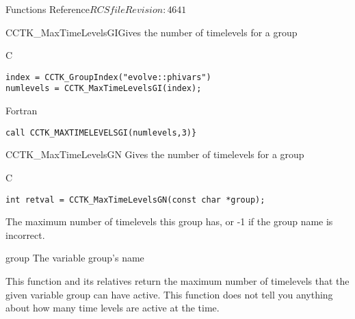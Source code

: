 \begin{cactuspart}{ Functions Reference}{$RCSfile$}{$Revision: 4641 $}
\begin{FunctionDescription}{CCTK\_MaxTimeLevelsGI}{Gives the number of timelevels for a group}
\begin{ExampleSection}
\begin{Example}{C}
\begin{verbatim}
index = CCTK_GroupIndex("evolve::phivars")
numlevels = CCTK_MaxTimeLevelsGI(index);
\end{verbatim}
\end{Example}
\begin{Example}{Fortran}
\begin{verbatim}
call CCTK_MAXTIMELEVELSGI(numlevels,3)}
\end{verbatim}
\end{Example}
\end{ExampleSection}
\end{FunctionDescription}


\begin{FunctionDescription}{CCTK\_MaxTimeLevelsGN}
\label{CCTK-MaxTimeLevelsGN}
Gives the number of timelevels for a group
\begin{SynopsisSection}
\begin{Synopsis}{C}
\begin{verbatim}int retval = CCTK_MaxTimeLevelsGN(const char *group);\end{verbatim}
\end{Synopsis}
\end{SynopsisSection}

\begin{ResultSection}
\begin{Result}{}
The maximum number of timelevels this group has, or -1 if the group name is incorrect.
\end{Result}
\end{ResultSection}

\begin{ParameterSection}
\begin{Parameter}{group}
The variable group's name
\end{Parameter}
\end{ParameterSection}

\begin{Discussion}
This function and its relatives return the maximum number of timelevels that the given variable group can have active.  This function does not tell you anything about how many time levels are active at the time.
\end{Discussion}
\end{FunctionDescription}




\end{cactuspart}
